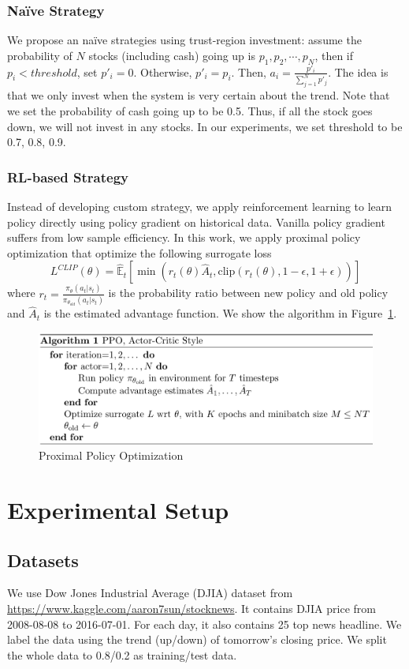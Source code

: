 \documentclass[11pt,a4paper]{article}
\begin{document}
\subsubsection{Na\"ive Strategy}
We propose an na\"ive strategies using trust-region investment: assume the probability of $N$ stocks (including cash) going up is $p_1, p_2, \cdots, p_N$, then if $p_i < threshold$, set $p'_i=0$. Otherwise, $p'_i=p_i$. Then, $a_i=\frac{p'_i}{\sum_{j=1}^{N}p'_j}$. The idea is that we only invest when the system is very certain about the trend. Note that we set the probability of cash going up to be 0.5. Thus, if all the stock goes down, we will not invest in any stocks. In our experiments, we set threshold to be 0.7, 0.8, 0.9.
\subsubsection{RL-based Strategy}
Instead of developing custom strategy, we apply reinforcement learning to learn policy directly using policy gradient on historical data. Vanilla policy gradient suffers from low sample efficiency. In this work, we apply proximal policy optimization that optimize the following surrogate loss
\begin{equation}
L^{CLIP}(\theta)=\hat{\mathbb{E}}_t[\min(r_t(\theta)\hat{A}_t, \text{clip}(r_t(\theta), 1-\epsilon, 1+\epsilon))]
\end{equation}
where $r_t=\frac{\pi_\theta(a_t|s_t)}{\pi_{\theta_{old}}(a_t|s_t)}$ is the probability ratio between new policy and old policy and $\hat{A}_t$ is the estimated advantage function. We show the algorithm in Figure~\ref{fig:ppo}.
\begin{figure}
  \centering
  \includegraphics[width=\linewidth]{ppo}
  \caption{Proximal Policy Optimization}
  \label{fig:ppo}
\end{figure}


\section{Experimental Setup}
\subsection{Datasets}
We use Dow Jones Industrial Average (DJIA) dataset from \url{https://www.kaggle.com/aaron7sun/stocknews}. It contains DJIA price from 2008-08-08 to 2016-07-01. For each day, it also contains 25 top news headline. We label the data using the trend (up/down) of tomorrow's closing price. We split the whole data to 0.8/0.2 as training/test data.
\end{document}
